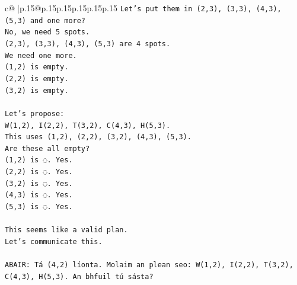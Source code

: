 \documentclass{article}
\begin{document}
{\begin{supertabular}{c@{$\;$}|p{.15\linewidth}@{}p{.15\linewidth}p{.15\linewidth}p{.15\linewidth}p{.15\linewidth}p{.15\linewidth}}
{{{\texttt{Let's put them in (2,3), (3,3), (4,3), (5,3) and one more?} \\
\texttt{No, we need 5 spots.} \\
\texttt{(2,3), (3,3), (4,3), (5,3) are 4 spots.} \\
\texttt{We need one more.} \\
\texttt{(1,2) is empty.} \\
\texttt{(2,2) is empty.} \\
\texttt{(3,2) is empty.} \\
\\ 
\texttt{Let's propose:} \\
\texttt{W(1,2), I(2,2), T(3,2), C(4,3), H(5,3).} \\
\texttt{This uses (1,2), (2,2), (3,2), (4,3), (5,3).} \\
\texttt{Are these all empty?} \\
\texttt{(1,2) is ◌. Yes.} \\
\texttt{(2,2) is ◌. Yes.} \\
\texttt{(3,2) is ◌. Yes.} \\
\texttt{(4,3) is ◌. Yes.} \\
\texttt{(5,3) is ◌. Yes.} \\
\\ 
\texttt{This seems like a valid plan.} \\
\texttt{Let's communicate this.} \\
\\ 
\texttt{ABAIR: Tá (4,2) líonta. Molaim an plean seo: W(1,2), I(2,2), T(3,2), C(4,3), H(5,3). An bhfuil tú sásta?} \\
            }
        }
    }
     \\ \\


\end{supertabular}}
\end{document}
